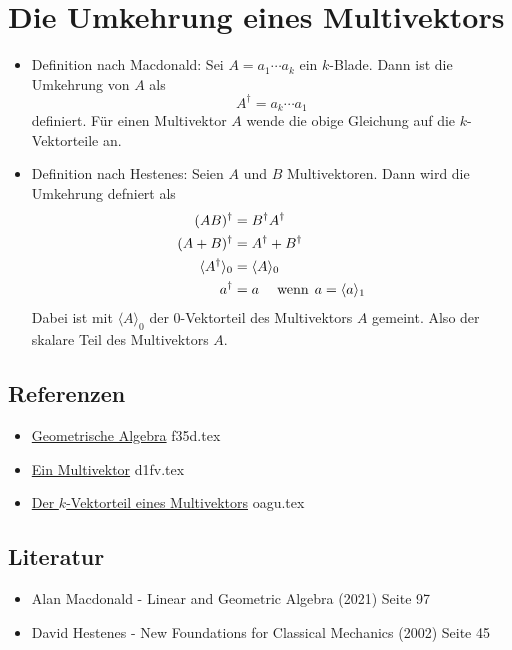 \documentclass{sajzk}
\begin{document}
\section{Die Umkehrung eines Multivektors}
\label{eelx}

\begin{itemize}
  \item  Definition nach Macdonald: Sei $A=a_1\cdots a_k$ ein $k$-Blade. Dann ist die
  Umkehrung von $A$ als
  \[
  A^\dagger = a_k\cdots a_1
  \]
  definiert. Für einen Multivektor $A$ wende die obige Gleichung auf die
  $k$-Vektorteile an.

  \item Definition nach Hestenes: Seien $A$ und $B$ Multivektoren. Dann wird die
  Umkehrung defniert als
  \begin{align*}
      (AB)^\dagger &= B^\dagger A^\dagger \\
      (A+B)^\dagger &= A^\dagger + B^\dagger \\
      \langle A^\dagger \rangle_0 &= \langle A \rangle_0\\
      a^\dagger &= a\hspace{3ex}\textrm{wenn}\hspace{1ex} a= \langle a\rangle_1
  \end{align*}
  Dabei ist mit $\langle A \rangle_0$ der $0$-Vektorteil des Multivektors $A$
  gemeint. Also der skalare Teil des Multivektors $A$.
\end{itemize}

\subsection{Referenzen}
\begin{itemize}
    \item \href{f35d.pdf}{Geometrische Algebra} f35d.tex
    \item \href{d1fv.pdf}{Ein Multivektor} d1fv.tex
    \item \href{oagu.pdf}{Der $k$-Vektorteil eines Multivektors} oagu.tex
\end{itemize}

\subsection{Literatur}
\begin{itemize}
    \item Alan Macdonald - Linear and Geometric Algebra (2021) Seite 97
    \item David Hestenes - New Foundations for Classical Mechanics (2002) Seite 45
\end{itemize}
\end{document}
